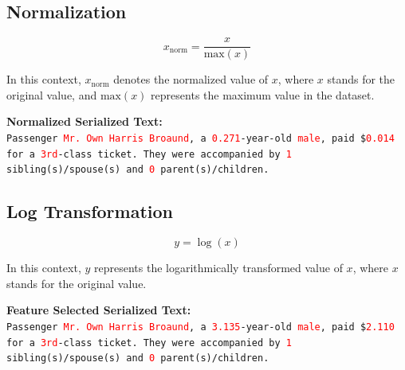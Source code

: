 \documentclass{article}
\theoremstyle{plain}
\theoremstyle{definition}
\theoremstyle{remark}
\begin{document}
\subsection*{Normalization}

\begin{equation}
x_{\text{norm}} = \frac{x}{\text{max}(x)}
\end{equation}

In this context, \( x_{\text{norm}} \) denotes the normalized value of \( x \), where \( x \) stands for the original value, and \( \text{max}(x) \) represents the maximum value in the dataset.

\begin{mdframed}
\textbf{Normalized Serialized Text:}\\
\texttt{Passenger \textcolor{red}{Mr. Own Harris Broaund}, a \textcolor{red}{0.271}-year-old \textcolor{red}{male}, paid \$\textcolor{red}{0.014} for a \textcolor{red}{3rd}-class ticket. They were accompanied by \textcolor{red}{1} sibling(s)/spouse(s) and \textcolor{red}{0} parent(s)/children.
}
\end{mdframed}

\subsection*{Log Transformation}
\begin{equation}
y = \log(x)
\end{equation}

In this context, \( y \) represents the logarithmically transformed value of \( x \), where \( x \) stands for the original value.

\begin{mdframed}
\textbf{Feature Selected Serialized Text:}\\
\texttt{Passenger \textcolor{red}{Mr. Own Harris Broaund}, a \textcolor{red}{3.135}-year-old \textcolor{red}{male}, paid \$\textcolor{red}{2.110} for a \textcolor{red}{3rd}-class ticket. They were accompanied by \textcolor{red}{1} sibling(s)/spouse(s) and \textcolor{red}{0} parent(s)/children.
}
\end{mdframed}


\newpage
\end{document}
